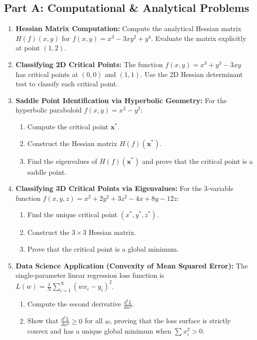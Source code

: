 \subsection*{Part A: Computational \& Analytical Problems}
\begin{enumerate}
\item \textbf{Hessian Matrix Computation:} Compute the analytical Hessian matrix $H(f)(x, y)$ for $f(x, y) = x^3 - 3xy^2 + y^4$. Evaluate the matrix explicitly at point $(1, 2)$.

\item \textbf{Classifying 2D Critical Points:} The function $f(x, y) = x^3 + y^3 - 3xy$ has critical points at $(0, 0)$ and $(1, 1)$. Use the 2D Hessian determinant test to classify each critical point.

\item \textbf{Saddle Point Identification via Hyperbolic Geometry:} For the hyperbolic paraboloid $f(x, y) = x^2 - y^2$:
\begin{enumerate}
    \item Compute the critical point $\mathbf{x}^*$.
    \item Construct the Hessian matrix $H(f)(\mathbf{x}^*)$.
    \item Find the eigenvalues of $H(f)(\mathbf{x}^*)$ and prove that the critical point is a saddle point.
\end{enumerate}

\item \textbf{Classifying 3D Critical Points via Eigenvalues:} For the 3-variable function $f(x, y, z) = x^2 + 2y^2 + 3z^2 - 4x + 8y - 12z$:
\begin{enumerate}
    \item Find the unique critical point $(x^*, y^*, z^*)$.
    \item Construct the $3 \times 3$ Hessian matrix.
    \item Prove that the critical point is a global minimum.
\end{enumerate}

\item \textbf{Data Science Application (Convexity of Mean Squared Error):} The single-parameter linear regression loss function is $L(w) = \frac{1}{N} \sum_{i=1}^N (w x_i - y_i)^2$.
\begin{enumerate}
    \item Compute the second derivative $\frac{d^2 L}{dw^2}$.
    \item Show that $\frac{d^2 L}{dw^2} \ge 0$ for all $w$, proving that the loss surface is strictly convex and has a unique global minimum when $\sum x_i^2 > 0$.
\end{enumerate}
\end{enumerate}


